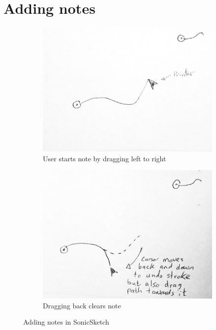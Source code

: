 \documentclass[12pt]{report}
\begin{document}
\section{Adding notes}
\label{sec:org4a2039c}
\begin{LATEX}
\begin{figure}
    \begin{subfigure}{0.475\textwidth}
        \includegraphics[width=\textwidth]{./charts/images/attractor-01.png}
        \caption{User starts note by dragging left to right}
    \end{subfigure}
    \hfill
    \begin{subfigure}{0.475\textwidth}
        \includegraphics[width=\textwidth]{./charts/images/attractor-02.png}
        \centering
        \caption{Dragging back clears note}
    \end{subfigure}

    \caption{Adding notes in SonicSketch}
    \label{fig:adding-notes-sketch}
\end{figure}
\label{org12d88e5}
\end{LATEX}
\end{document}
